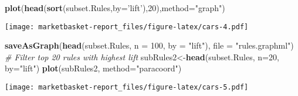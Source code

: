\documentclass[
]{article}
\newenvironment{Shaded}{\begin{snugshade}}{\end{snugshade}}
\newcommand{\CommentTok}[1]{\textcolor[rgb]{0.56,0.35,0.01}{\textit{#1}}}
\newcommand{\DataTypeTok}[1]{\textcolor[rgb]{0.13,0.29,0.53}{#1}}
\newcommand{\DecValTok}[1]{\textcolor[rgb]{0.00,0.00,0.81}{#1}}
\newcommand{\KeywordTok}[1]{\textcolor[rgb]{0.13,0.29,0.53}{\textbf{#1}}}
\newcommand{\NormalTok}[1]{#1}
\newcommand{\StringTok}[1]{\textcolor[rgb]{0.31,0.60,0.02}{#1}}
\begin{document}
\begin{Shaded}
\begin{Highlighting}[]
\KeywordTok{plot}\NormalTok{(}\KeywordTok{head}\NormalTok{(}\KeywordTok{sort}\NormalTok{(subset.Rules,}\DataTypeTok{by=}\StringTok{'lift'}\NormalTok{),}\DecValTok{20}\NormalTok{),}\DataTypeTok{method=}\StringTok{"graph"}\NormalTok{)}
\end{Highlighting}
\end{Shaded}

\texttt{[image: marketbasket-report\_files/figure-latex/cars-4.pdf]}

\begin{Shaded}
\begin{Highlighting}[]
\KeywordTok{saveAsGraph}\NormalTok{(}\KeywordTok{head}\NormalTok{(subset.Rules, }\DataTypeTok{n =} \DecValTok{100}\NormalTok{, }\DataTypeTok{by =} \StringTok{"lift"}\NormalTok{), }\DataTypeTok{file =} \StringTok{"rules.graphml"}\NormalTok{)}
\CommentTok{# Filter top 20 rules with highest lift}
\NormalTok{subRules2<-}\KeywordTok{head}\NormalTok{(subset.Rules, }\DataTypeTok{n=}\DecValTok{20}\NormalTok{, }\DataTypeTok{by=}\StringTok{"lift"}\NormalTok{)}
\KeywordTok{plot}\NormalTok{(subRules2, }\DataTypeTok{method=}\StringTok{"paracoord"}\NormalTok{)}
\end{Highlighting}
\end{Shaded}

\texttt{[image: marketbasket-report\_files/figure-latex/cars-5.pdf]}
\end{document}
